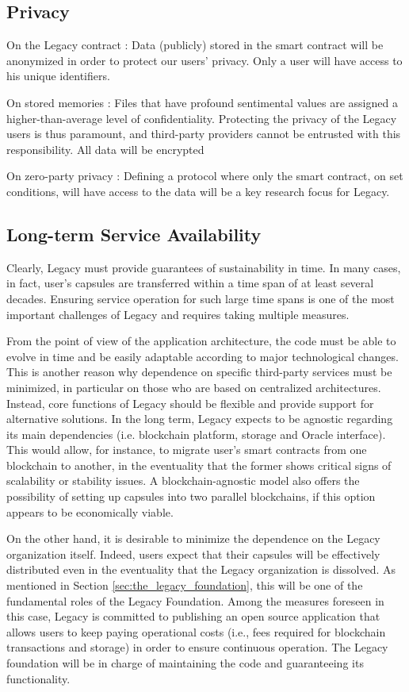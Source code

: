 \subsection{Privacy} %
\label{sub:privacy}
On the Legacy contract :
Data (publicly) stored in the smart contract will be anonymized in order to protect our users’ privacy. Only a user will have access to his unique identifiers.

On stored memories :
Files that have profound sentimental values are assigned a higher-than-average level of confidentiality. Protecting the privacy of the Legacy users is thus paramount, and third-party providers cannot be entrusted with this responsibility. All data will be encrypted

On zero-party privacy :
Defining a protocol where only the smart contract, on set conditions, will have access to the data will be a key research focus for Legacy.

\subsection{Long-term Service Availability} %
\label{sub:long_term_service_availability}
Clearly, Legacy must provide guarantees of sustainability in time. In many cases, in fact, user's capsules are transferred within a time span of at least several decades.  Ensuring service operation for such large time spans is one of the most important challenges of Legacy and requires taking multiple measures. 

From the point of view of the application architecture, the code must be able to evolve in time and be easily adaptable according to major technological changes. This is another reason why dependence on specific third-party services must be minimized, in particular on those who are based on centralized architectures. Instead, core functions of Legacy should be flexible and provide support for alternative solutions. In the long term, Legacy expects to be agnostic regarding its main dependencies (i.e. blockchain platform, storage and Oracle interface). This would allow, for instance, to migrate user’s smart contracts from one blockchain to another, in the eventuality that the former shows critical signs of scalability or stability issues. A blockchain-agnostic model also offers the possibility of setting up capsules into two parallel blockchains, if this option appears to be economically viable.    

On the other hand, it is desirable to minimize the dependence on the Legacy organization itself. Indeed, users expect that their capsules will be effectively distributed even in the eventuality that the Legacy organization is dissolved. As mentioned in Section \ref{sec:the_legacy_foundation}, this will be one of the fundamental roles of the Legacy Foundation. Among the measures foreseen in this case, Legacy is committed to publishing an open source application that allows users to keep paying operational costs (i.e., fees required for blockchain transactions and storage) in order to ensure continuous operation. The Legacy foundation will be in charge of maintaining the code and guaranteeing its functionality.


